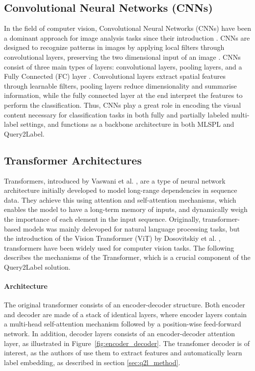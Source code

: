 \documentclass[lettersize,journal]{IEEEtran}
\begin{document}
\subsection{Convolutional Neural Networks (CNNs)}
In the field of computer vision, Convolutional Neural Networks (CNNs) have been a dominant approach for image analysis tasks since their introduction \cite{lecun95}. CNNs are designed to recognize patterns in images by applying local filters through convolutional layers, preserving the two dimensional input of an image \cite{zhang2023dive}. CNNs consist of three main types of layers: convolutional layers, pooling layers, and a Fully Connected (FC) layer \cite{asawaCS231n}. Convolutional layers extract spatial features through learnable filters, pooling layers reduce dimensionality and summarise information, while the fully connected layer at the end interpret the features to perform the classification. Thus, CNNs play a great role in encoding the visual content necessary for classification tasks in both fully and partially labeled multi-label settings, and functions as a backbone architecture in both MLSPL and Query2Label.

\subsection{Transformer Architectures}
Transformers, introduced by Vaswani et al. \cite{vaswani2023attentionneed}, are a type of neural network architecture initially developed to model long-range dependencies in sequence data. They achieve this using attention and self-attention mechanisms, which enables the model to have a long-term memory of inputs, and dynamically weigh the importance of each element in the input sequence. Originally, transformer-based models was mainly delevoped for natural language processing tasks, but the introduction of the Vision Transformer (ViT) by Dosovitskiy et al. \cite{dosovitskiy2021imageworth16x16words}, transformers have been widely used for computer vision tasks. The following describes the mechanisms of the Transformer, which is a crucial component of the Query2Label solution.


\paragraph{Architecture}
The original transformer consists of an encoder-decoder structure. Both encoder and decoder are made of a stack of identical layers, where encoder layers contain a multi-head self-attention mechanism followed by a position-wise feed-forward network. In addition, decoder layers consists of an encoder-decoder attention layer, as illustrated in Figure~\ref{fig:encoder_decoder}. The transfomer decoder is of interest, as the authors of \cite{Query2Label} use them to extract features and automatically learn label embedding, as described in section \ref{sec:q2l_method}.
\end{document}
